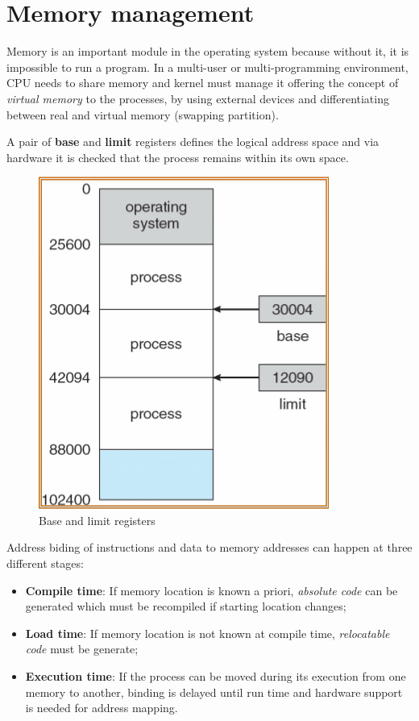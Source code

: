 \chapter{Memory management}
Memory is an important module in the operating system because without it, it is impossible to run a program. In a multi-user or multi-programming environment, CPU needs to share memory and kernel must manage it offering the concept of \emph{virtual memory} to the processes, by using external devices and differentiating between real and virtual memory (swapping partition).

A pair of \textbf{base} and \textbf{limit} registers defines the logical address space and via hardware it is checked that the process remains within its own space.

\begin{figure}[hbtp]
\centering
\includegraphics[scale=0.4]{images/memory_management/base_limit_regs.jpg}
\caption{Base and limit registers}
\end{figure}

Address biding of instructions and data to memory addresses can happen at three different stages:

\begin{itemize}
\item \textbf{Compile time}: If memory location is known a priori, \emph{absolute code} can be generated which must be recompiled if starting location changes;
\item \textbf{Load time}: If memory location is not known at compile time, \emph{relocatable code} must be generate;
\item \textbf{Execution time}: If the process can be moved during its execution from one memory to another, binding is delayed until run time and hardware support is needed for address mapping.
\end{itemize}

